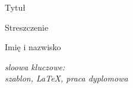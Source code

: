 \begin{description}[leftmargin=2.2cm,font=\normalfont]
\item[Tytuł pracy:]  Tytuł
\end{description}

Streszczenie



\begin{flushright}
	Imię i nazwisko
\end{flushright}

\vspace{0.025\textheight}
\textit{sloowa kluczowe:}\\
\textit{szablon, LaTeX, praca dyplomowa}
